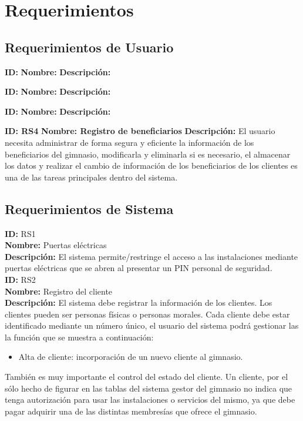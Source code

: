 \chapter*{Requerimientos}\label{cap.requerimientos}


\section{Requerimientos de Usuario}

\textbf{ID: }
\textbf{Nombre: }
\textbf{Descripci\'on: }

\textbf{ID: }
\textbf{Nombre: }
\textbf{Descripci\'on: }

\textbf{ID: }
\textbf{Nombre: }
\textbf{Descripci\'on: }

\textbf{ID: RS4}
\textbf{Nombre: Registro de beneficiarios }
\textbf{Descripci\'on: } El usuario necesita administrar de forma segura y eficiente la información de los beneficiarios del gimnasio, modificarla y eliminarla si es necesario, el almacenar los datos y realizar el cambio de información de los beneficiarios de los clientes es una de las tareas principales dentro del sistema.\\

\section{Requerimientos de Sistema}
\textbf{ID: } RS1 \\
\textbf{Nombre:} Puertas eléctricas \\
\textbf{Descripción:} El sistema permite/restringe el acceso a las instalaciones mediante puertas eléctricas que se abren al presentar un PIN personal de seguridad.\\

\textbf{ID: } RS2\\
\textbf{Nombre: }Registro del cliente\\
\textbf{Descripción:} El sistema debe registrar la información de los clientes. Los clientes pueden ser personas físicas o personas morales. Cada cliente debe estar identificado mediante un número único, el usuario del sistema podrá gestionar las la función que se muestra a continuación:\\
	\begin{itemize} 
		\item Alta de cliente: incorporación de un nuevo cliente al gimnasio.
	\end{itemize}
También es muy importante el control del estado del cliente. Un cliente, por el sólo hecho de figurar en las tablas del sistema gestor del gimnasio no indica que tenga autorización para usar las instalaciones o servicios del mismo, ya que debe pagar adquirir una de las distintas membresías que ofrece el gimnasio.\\

